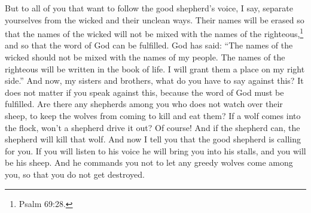\bverse \iffalse And now I say unto you, all you that are desirous to follow the voice of the good shepherd, come ye out from the wicked, and be ye separate, and touch not their unclean things; and behold, their names shall be blotted out, that the names of the wicked shall not be numbered among the names of the righteous, that the word of God may be fulfilled, which saith: The names of the wicked shall not be mingled with the names of my people; \fi
But to all of you that want to follow the good shepherd's voice, I say, separate yourselves from the wicked and their unclean ways. Their names will be erased so that the names of the wicked will not be mixed with the names of the righteous,\footnote{Psalm 69:28.} and so that the word of God can be fulfilled. God has said: ``The names of the wicked should not be mixed with the names of my people.
\bverse \iffalse For the names of the righteous shall be written in the book of life, and unto them will I grant an inheritance at my right hand. And now, my brethren, what have ye to say against this? I say unto you, if ye speak against it, it matters not, for the word of God must be fulfilled. \fi
The names of the righteous will be written in the book of life. I will grant them a place on my right side.'' And now, my sisters and brothers, what do you have to say against this? It does not matter if you speak against this, because the word of God must be fulfilled.
\bverse \iffalse For what shepherd is there among you having many sheep doth not watch over them, that the wolves enter not and devour his flock? And behold, if a wolf enter his flock doth he not drive him out? Yea, and at the last, if he can, he will destroy him. \fi
Are there any shepherds among you who does not watch over their sheep, to keep the wolves from coming to kill and eat them? If a wolf comes into the flock, won't a shepherd drive it out? Of course! And if the shepherd can, the shepherd will kill that wolf.
\bverse \iffalse And now I say unto you that the good shepherd doth call after you; and if you will hearken unto his voice he will bring you into his fold, and ye are his sheep; and he commandeth you that ye suffer no ravenous wolf to enter among you, that ye may not be destroyed. \fi
And now I tell you that the good shepherd is calling for you. If you will listen to his voice he will bring you into his stalls, and you will be his sheep. And he commands you not to let any greedy wolves come among you, so that you do not get destroyed.
\bverse \iffalse And now I, Alma, do command you in the language of him who hath commanded me, that ye observe to do the words which I have spoken unto you. \fi

